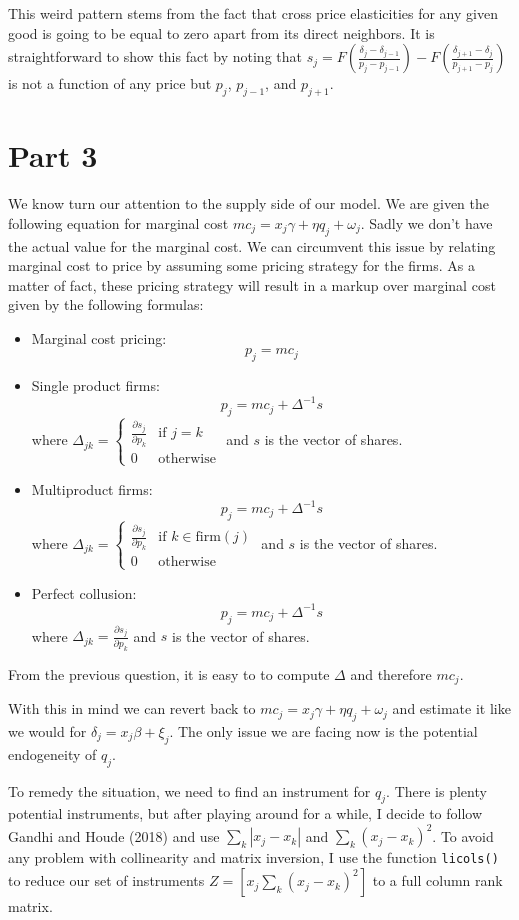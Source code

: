 \documentclass[12pt]{article}
\newcommand{\1}{{\bf 1}} %
\newcommand{\inv}{^{-1}}
\newcommand{\mat}[1]{\begin{matrix}#1\end{matrix}}
\begin{document}
This weird pattern stems from the fact that cross price elasticities for any given good is going to be equal to zero apart from its direct neighbors. It is straightforward to show this fact by noting that $s_j= F\left({\frac{\delta_j-\delta_{j-1}}{p_j-p_{j-1}}}\right) - F\left( {\frac{\delta_{j+1}-\delta_{j}}{p_{j+1}-p_{j}}}\right)$ is not a function of any price but $p_j$, $p_{j-1}$, and $p_{j+1}$.

\section*{Part 3}

We know turn our attention to the supply side of our model. We are given the following equation for marginal cost $mc_j = x_j\gamma +\eta q_j +\omega_j$. Sadly we don't have the actual value for the marginal cost. We can circumvent this issue by relating marginal cost to price by assuming some pricing strategy for the firms. As a matter of fact, these pricing strategy will result in a markup over marginal cost given by the following formulas:
\begin{itemize}
	\item Marginal cost pricing:
	\[
p_j = mc_j
	\]
	\item Single product firms:
	\[
p_j = mc_j +\Delta\inv s
	\]
	where $\Delta_{jk} = \left\{\mat{\frac{\partial s_j}{\partial p_k} & \text{if }j=k\\ 0 & \text{otherwise}}\right.$ and $s$ is the vector of shares.

	\item Multiproduct firms:
	\[
p_j = mc_j +\Delta\inv s
	\]
	where $\Delta_{jk} = \left\{\mat{\frac{\partial s_j}{\partial p_k} & \text{if }k\in \text{firm}(j)\\ 0 & \text{otherwise}}\right.$ and $s$ is the vector of shares.

	\item Perfect collusion:
	\[
p_j = mc_j +\Delta\inv s
	\]
	where $\Delta_{jk} = \frac{\partial s_j}{\partial p_k} $ and $s$ is the vector of shares.
\end{itemize}

From the previous question, it is easy to to compute $\Delta$ and therefore $mc_j$.

With this in mind we can revert back to $mc_j = x_j\gamma +\eta q_j +\omega_j$ and estimate it like we would for $\delta_j = x_j\beta +\xi_j$. The only issue we are facing now is	the potential endogeneity of $q_j$.

To remedy the situation, we need to find an instrument for $q_j$. There is plenty potential instruments, but after playing around for a while, I decide to follow Gandhi and Houde (2018) and use $\sum_k |x_j-x_k|$ and $\sum_k (x_j - x_k)^2$. To avoid any problem with collinearity and matrix inversion, I use the function \verb!licols()! to reduce our set of instruments $Z = [x_j \sum_k (x_j - x_k)^2]$ to a full column rank matrix.
\end{document}
